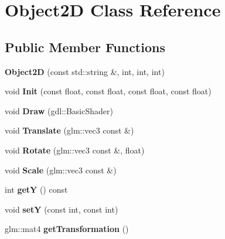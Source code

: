 \hypertarget{class_object2_d}{}\section{Object2\+D Class Reference}
\label{class_object2_d}
\subsection*{Public Member Functions}
\begin{DoxyCompactItemize}
\item 
\hypertarget{class_object2_d_a0a511925e573ceda05d2182544ab204e}{}{\bfseries Object2\+D} (const std\+::string \&, int, int, int)\label{class_object2_d_a0a511925e573ceda05d2182544ab204e}

\item 
\hypertarget{class_object2_d_ad9df2ecd028b66abaea3f9c16b8e78a1}{}void {\bfseries Init} (const float, const float, const float, const float)\label{class_object2_d_ad9df2ecd028b66abaea3f9c16b8e78a1}

\item 
\hypertarget{class_object2_d_aa28b9d0f6f4525c274fae4cd98092082}{}void {\bfseries Draw} (gdl\+::\+Basic\+Shader)\label{class_object2_d_aa28b9d0f6f4525c274fae4cd98092082}

\item 
\hypertarget{class_object2_d_ae7d17cb62746a08fd3b043d38f10144a}{}void {\bfseries Translate} (glm\+::vec3 const \&)\label{class_object2_d_ae7d17cb62746a08fd3b043d38f10144a}

\item 
\hypertarget{class_object2_d_a6842880f824c14a60f43274734ab937e}{}void {\bfseries Rotate} (glm\+::vec3 const \&, float)\label{class_object2_d_a6842880f824c14a60f43274734ab937e}

\item 
\hypertarget{class_object2_d_a34cc558698a19a464389d0bd687795c4}{}void {\bfseries Scale} (glm\+::vec3 const \&)\label{class_object2_d_a34cc558698a19a464389d0bd687795c4}

\item 
\hypertarget{class_object2_d_aece5d55ec2aac2fc21ff523b70d82051}{}int {\bfseries get\+Y} () const \label{class_object2_d_aece5d55ec2aac2fc21ff523b70d82051}

\item 
\hypertarget{class_object2_d_a3bef51c938f30133da86b2341e8fbd0b}{}void {\bfseries set\+Y} (const int, const int)\label{class_object2_d_a3bef51c938f30133da86b2341e8fbd0b}

\item 
\hypertarget{class_object2_d_a9fa42fc9ae65b5b362b1e02ffebba12d}{}glm\+::mat4 {\bfseries get\+Transformation} ()\label{class_object2_d_a9fa42fc9ae65b5b362b1e02ffebba12d}

\end{DoxyCompactItemize}
